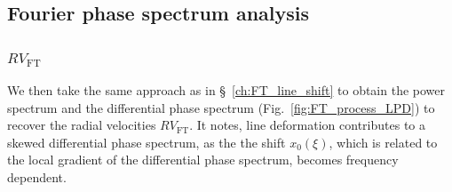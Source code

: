 \subsection{Fourier phase spectrum analysis}

\subsubsection{$RV_\text{FT}$}
We then take the same approach as in  \S~\ref{ch:FT_line_shift} to obtain the power spectrum and the differential phase spectrum (Fig.~\ref{fig:FT_process_LPD}) to recover the radial velocities $RV_\text{FT}$. It notes, line deformation contributes to a skewed differential phase spectrum, as the the shift $x_0(\xi)$, which is related to the local gradient of the differential phase spectrum, becomes frequency dependent. 

